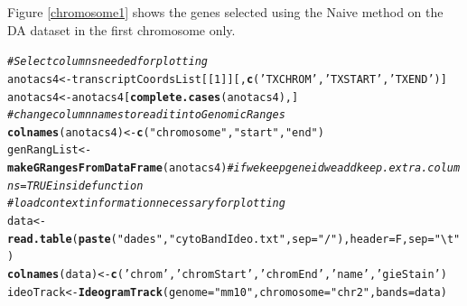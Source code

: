 \documentclass[a4paper,10pt]{article}\usepackage[]{graphicx}\usepackage[]{color}
\makeatletter
\newcommand{\hlnum}[1]{\textcolor[rgb]{0.686,0.059,0.569}{#1}}%
\newcommand{\hlstr}[1]{\textcolor[rgb]{0.192,0.494,0.8}{#1}}%
\newcommand{\hlcom}[1]{\textcolor[rgb]{0.678,0.584,0.686}{\textit{#1}}}%
\newcommand{\hlstd}[1]{\textcolor[rgb]{0.345,0.345,0.345}{#1}}%
\newcommand{\hlkwb}[1]{\textcolor[rgb]{0.69,0.353,0.396}{#1}}%
\newcommand{\hlkwc}[1]{\textcolor[rgb]{0.333,0.667,0.333}{#1}}%
\newcommand{\hlkwd}[1]{\textcolor[rgb]{0.737,0.353,0.396}{\textbf{#1}}}%
\newenvironment{kframe}{%
 \def\at@end@of@kframe{}%
 \ifinner\ifhmode%
  \def\at@end@of@kframe{\end{minipage}}%
  \begin{minipage}{\columnwidth}%
 \fi\fi%
 \def\FrameCommand##1{\hskip\@totalleftmargin \hskip-\fboxsep
 \colorbox{shadecolor}{##1}\hskip-\fboxsep
     \hskip-\linewidth \hskip-\@totalleftmargin \hskip\columnwidth}%
 \MakeFramed {\advance\hsize-\width
   \@totalleftmargin\z@ \linewidth\hsize
   \@setminipage}}%
 {\par\unskip\endMakeFramed%
 \at@end@of@kframe}
\newenvironment{knitrout}{}{} %
\makeatother
\begin{document}
Figure \ref{chromosome1} shows the genes selected using the Naive method on the DA dataset in the first chromosome only.

\begin{knitrout}
\color{fgcolor}\begin{kframe}
\begin{alltt}
\hlcom{# Select columns needed for plotting  }
\hlstd{anotacs4}\hlkwb{<-}\hlstd{transcriptCoordsList[[}\hlnum{1}\hlstd{]][,}\hlkwd{c}\hlstd{(}\hlstr{'TXCHROM'}\hlstd{,} \hlstr{'TXSTART'}\hlstd{,} \hlstr{'TXEND'}\hlstd{)]}
\hlstd{anotacs4}\hlkwb{<-}\hlstd{anotacs4[}\hlkwd{complete.cases}\hlstd{(anotacs4),]}
\hlcom{#change column names to read it into GenomicRanges}
\hlkwd{colnames}\hlstd{(anotacs4)}\hlkwb{<-}\hlkwd{c}\hlstd{(}\hlstr{"chromosome"}\hlstd{,}\hlstr{"start"}\hlstd{,}\hlstr{"end"}\hlstd{)}
\hlstd{genRangList}\hlkwb{<-}\hlkwd{makeGRangesFromDataFrame}\hlstd{(anotacs4)} \hlcom{#if we keep geneid we add keep.extra.columns=TRUE inside function}
\hlcom{# load context information necessary for plotting}
\hlstd{data} \hlkwb{<-} \hlkwd{read.table}\hlstd{(}\hlkwd{paste}\hlstd{(}\hlstr{"dades"}\hlstd{,}\hlstr{"cytoBandIdeo.txt"}\hlstd{,} \hlkwc{sep}\hlstd{=}\hlstr{"/"}\hlstd{),} \hlkwc{header}\hlstd{=F,} \hlkwc{sep}\hlstd{=}\hlstr{"\textbackslash{}t"}\hlstd{)}
\hlkwd{colnames}\hlstd{(data)} \hlkwb{<-}\hlkwd{c}\hlstd{(}\hlstr{'chrom'}\hlstd{,} \hlstr{'chromStart'}\hlstd{,} \hlstr{'chromEnd'}\hlstd{,} \hlstr{'name'}\hlstd{,} \hlstr{'gieStain'}\hlstd{)}
\hlstd{ideoTrack} \hlkwb{<-} \hlkwd{IdeogramTrack}\hlstd{(}\hlkwc{genome}\hlstd{=}\hlstr{"mm10"}\hlstd{,}\hlkwc{chromosome} \hlstd{=} \hlstr{"chr2"}\hlstd{,} \hlkwc{bands}\hlstd{=data)}


\end{alltt}
\end{kframe}
\end{knitrout}
\end{document}
